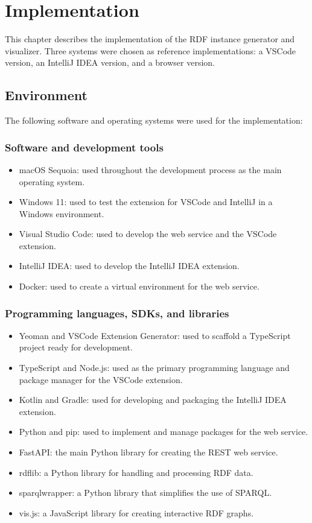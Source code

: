 \chapter{Implementation\label{cha:chapter4}}

This chapter describes the implementation of the RDF instance generator and visualizer. 
Three systems were chosen as reference implementations: a VSCode version, an IntelliJ IDEA version, and a browser version.

\section{Environment\label{sec:env}}
The following software and operating systems were used for the implementation:

\subsection{Software and development tools\label{sec:os}}

\begin{itemize}
  \item macOS Sequoia: used throughout the development process as the main operating system.
  \item Windows 11: used to test the extension for VSCode and IntelliJ in a Windows environment.
  \item Visual Studio Code: used to develop the web service and the VSCode extension.
  \item IntelliJ IDEA: used to develop the IntelliJ IDEA extension.
  \item Docker: used to create a virtual environment for the web service.
\end{itemize}

\subsection{Programming languages, SDKs, and libraries\label{sec:proglang}}

\begin{itemize}
    \item Yeoman and VSCode Extension Generator: used to scaffold a TypeScript project ready for development.
    \item TypeScript and Node.js: used as the primary programming language and package manager for the VSCode extension.
    \item Kotlin and Gradle: used for developing and packaging the IntelliJ IDEA extension.
    \item Python and pip: used to implement and manage packages for the web service.
    \item FastAPI: the main Python library for creating the REST web service.
    \item rdflib: a Python library for handling and processing RDF data.
    \item sparqlwrapper: a Python library that simplifies the use of SPARQL.
    \item vis.js: a JavaScript library for creating interactive RDF graphs.
\end{itemize}

